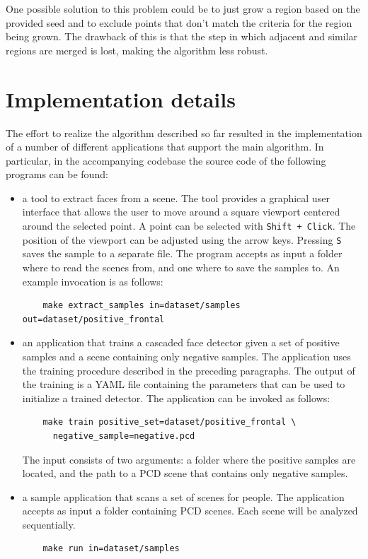 \documentclass[a4paper,11pt,titlepage]{article}
\begin{document}
One possible solution to this problem could be to just grow a region based on
the provided seed and to exclude points that don't match the criteria for the
region being grown. The drawback of this is that the step in which adjacent and
similar regions are merged is lost, making the algorithm less robust.

\section{Implementation details}
The effort to realize the algorithm described so far resulted in the
implementation of a number of different applications that support the main
algorithm. In particular, in the accompanying codebase the source code of the
following programs can be found:

\begin{itemize}
  \item a tool to extract faces from a scene. The tool provides a graphical user
    interface that allows the user to move around a square viewport centered
    around the selected point. A point can be selected with \texttt{Shift +
    Click}. The position of the viewport can be adjusted using the arrow keys.
    Pressing \texttt{S} saves the sample to a separate file. The program accepts
    as input a folder where to read the scenes from, and one where to save the
    samples to. An example invocation is as follows:

    \begin{verbatim}
    make extract_samples in=dataset/samples out=dataset/positive_frontal
    \end{verbatim}

  \item an application that trains a cascaded face detector given a set of
    positive samples and a scene containing only negative samples. The
    application uses the training procedure described in the preceding
    paragraphs. The output of the training is a YAML file containing the
    parameters that can be used to initialize a trained detector. The
    application can be invoked as follows:

    \begin{verbatim}
    make train positive_set=dataset/positive_frontal \
      negative_sample=negative.pcd
    \end{verbatim}

    The input consists of two arguments: a folder where the positive samples are
    located, and the path to a PCD scene that contains only negative samples.

  \item a sample application that scans a set of scenes for people. The
    application accepts as input a folder containing PCD scenes. Each scene will
    be analyzed sequentially.

    \begin{verbatim}
    make run in=dataset/samples
    \end{verbatim}
\end{itemize}
\end{document}
